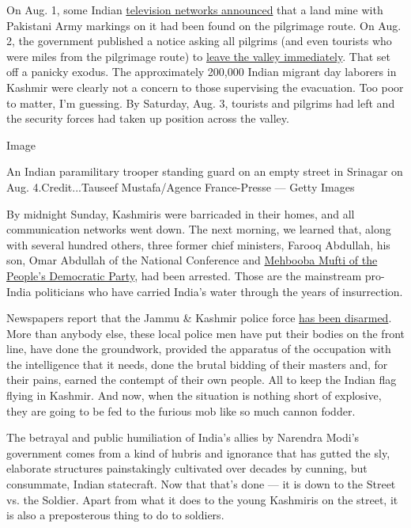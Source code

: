 On Aug. 1, some Indian
\href{https://www.youtube.com/watch?v=8Ta1Dj9LHgM}{television networks
announced} that a land mine with Pakistani Army markings on it had been
found on the pilgrimage route. On Aug. 2, the government published a
notice asking all pilgrims (and even tourists who were miles from the
pilgrimage route) to
\href{https://www.indiatoday.in/india/story/leave-kashmir-j-k-administration-issues-security-advisory-for-amarnath-pilgrims-1576494-2019-08-02}{leave
the valley immediately}. That set off a panicky exodus. The
approximately 200,000 Indian migrant day laborers in Kashmir were
clearly not a concern to those supervising the evacuation. Too poor to
matter, I'm guessing. By Saturday, Aug. 3, tourists and pilgrims had
left and the security forces had taken up position across the valley.

Image

An Indian paramilitary trooper standing guard on an empty street in
Srinagar on Aug. 4.Credit...Tauseef Mustafa/Agence France-Presse ---
Getty Images

By midnight Sunday, Kashmiris were barricaded in their homes, and all
communication networks went down. The next morning, we learned that,
along with several hundred others, three former chief ministers, Farooq
Abdullah, his son, Omar Abdullah of the National Conference and
\href{https://www.livemint.com/politics/news/mehbooba-mufti-omar-abdullah-arrested-after-scrapping-of-article-370-1565015217174.html}{Mehbooba
Mufti of the People's Democratic Party}, had been arrested. Those are
the mainstream pro-India politicians who have carried India's water
through the years of insurrection.

Newspapers report that the Jammu \& Kashmir police force
\href{https://www.telegraphindia.com/india/disarmed-fall-guys-of-article-370/cid/1696748}{has
been disarmed}. More than anybody else, these local police men have put
their bodies on the front line, have done the groundwork, provided the
apparatus of the occupation with the intelligence that it needs, done
the brutal bidding of their masters and, for their pains, earned the
contempt of their own people. All to keep the Indian flag flying in
Kashmir. And now, when the situation is nothing short of explosive, they
are going to be fed to the furious mob like so much cannon fodder.

The betrayal and public humiliation of India's allies by Narendra Modi's
government comes from a kind of hubris and ignorance that has gutted the
sly, elaborate structures painstakingly cultivated over decades by
cunning, but consummate, Indian statecraft. Now that that's done --- it
is down to the Street vs. the Soldier. Apart from what it does to the
young Kashmiris on the street, it is also a preposterous thing to do to
soldiers.

